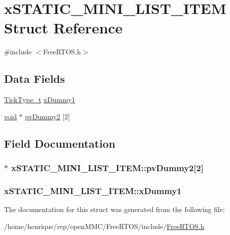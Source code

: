 \hypertarget{structxSTATIC__MINI__LIST__ITEM}{\section{x\-S\-T\-A\-T\-I\-C\-\_\-\-M\-I\-N\-I\-\_\-\-L\-I\-S\-T\-\_\-\-I\-T\-E\-M Struct Reference}
\label{structxSTATIC__MINI__LIST__ITEM}
}


{\ttfamily \#include $<$Free\-R\-T\-O\-S.\-h$>$}

\subsection*{Data Fields}
\begin{DoxyCompactItemize}
\item 
\hyperlink{Flsh186_2prtmacro_8h_aa69c48c6e902ce54f70886e6573c92a9}{Tick\-Type\-\_\-t} \hyperlink{structxSTATIC__MINI__LIST__ITEM_a43efd282907e8243bca29338d55dbefa}{x\-Dummy1}
\item 
\hyperlink{Paradigm_2Tern__EE_2small_2portmacro_8h_a14d32f8130d3c0b212cfc751730b5b49}{void} $\ast$ \hyperlink{structxSTATIC__MINI__LIST__ITEM_a384ac285efb6edf346f260bdc09ccac6}{pv\-Dummy2} \mbox{[}2\mbox{]}
\end{DoxyCompactItemize}


\subsection{Field Documentation}
\hypertarget{structxSTATIC__MINI__LIST__ITEM_a384ac285efb6edf346f260bdc09ccac6}{
\subsubsection[{pv\-Dummy2}]{$\ast$ x\-S\-T\-A\-T\-I\-C\-\_\-\-M\-I\-N\-I\-\_\-\-L\-I\-S\-T\-\_\-\-I\-T\-E\-M\-::pv\-Dummy2\mbox{[}2\mbox{]}}}\label{structxSTATIC__MINI__LIST__ITEM_a384ac285efb6edf346f260bdc09ccac6}
\hypertarget{structxSTATIC__MINI__LIST__ITEM_a43efd282907e8243bca29338d55dbefa}{
\subsubsection[{x\-Dummy1}]{ x\-S\-T\-A\-T\-I\-C\-\_\-\-M\-I\-N\-I\-\_\-\-L\-I\-S\-T\-\_\-\-I\-T\-E\-M\-::x\-Dummy1}}\label{structxSTATIC__MINI__LIST__ITEM_a43efd282907e8243bca29338d55dbefa}


The documentation for this struct was generated from the following file\-:\begin{DoxyCompactItemize}
\item 
/home/henrique/rep/open\-M\-M\-C/\-Free\-R\-T\-O\-S/include/\hyperlink{FreeRTOS_8h}{Free\-R\-T\-O\-S.\-h}\end{DoxyCompactItemize}

